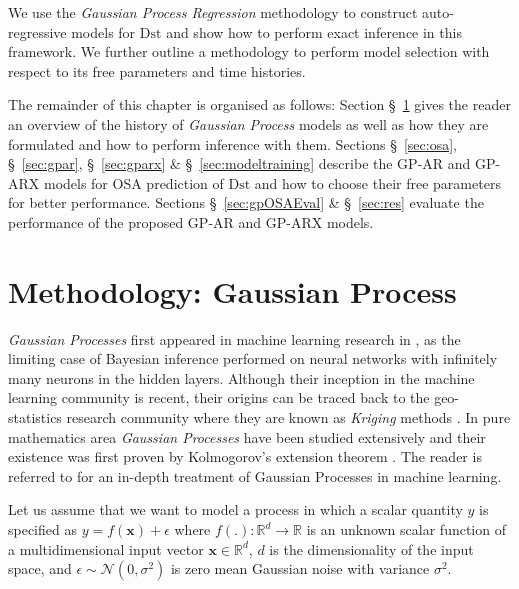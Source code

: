 We use the \emph{Gaussian Process Regression} methodology to construct auto-regressive models for 
$\mathrm{Dst}$ and show how to perform exact inference in this framework. We further outline a 
methodology to perform model selection with respect to its free parameters and time histories.

The remainder of this chapter is organised as follows: Section \S~\ref{sec:osaGPmethod} gives the 
reader an overview of the history of \emph{Gaussian Process} models as well as how they are 
formulated and how to perform inference with them. Sections \S~\ref{sec:osa}, \S~\ref{sec:gpar}, 
\S~\ref{sec:gparx} \& \S~\ref{sec:modeltraining} describe the GP-AR and GP-ARX models for OSA 
prediction of $\mathrm{Dst}$ and how to choose their free parameters for better performance. 
Sections \S~\ref{sec:gpOSAEval} \& \S~\ref{sec:res} evaluate the performance of the proposed 
GP-AR and GP-ARX models.

\section{Methodology: Gaussian Process} \label{sec:osaGPmethod}

\emph{Gaussian Processes} first appeared in machine learning research in 
\citet{Neal:1996:BLN:525544}, as the limiting case of Bayesian inference performed on neural 
networks with infinitely many neurons in the hidden layers. Although their inception in the machine 
learning community is recent, their origins can be traced back to the geo-statistics research 
community where they are known as \emph{Kriging} methods \citep{krige1951statistical}. In pure 
mathematics area \emph{Gaussian Processes} have been studied extensively and their existence was 
first proven by Kolmogorov's extension theorem \citep{tao2011introduction}. The reader is referred 
to \citet{Rasmussen:2005:GPM:1162254} for an in-depth treatment of Gaussian Processes in 
machine learning.

Let us assume that we want to model a process in which a scalar quantity $y$ is specified as 
$y = f(\mathbf{x}) + \epsilon$ where   $f(.): \mathbb{R}^d \rightarrow \mathbb{R}$ is an unknown 
scalar function of a multidimensional input vector $\mathbf{x} \in \mathbb{R}^d$, $d$ is the 
dimensionality of the input space, and $\epsilon \sim \mathcal{N}(0, \sigma^2)$ is zero mean 
Gaussian noise with variance $\sigma^2$.

